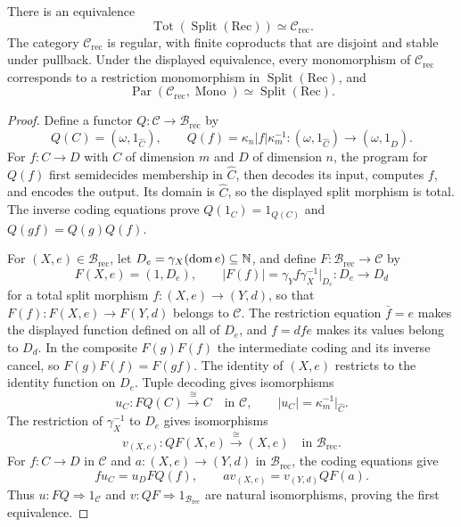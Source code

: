 \begin{proposition}\label{prop:numerical-structure}
There is an equivalence
\[
 \operatorname{Tot}(\operatorname{Split}(\mathrm{Rec}))
       \simeq\mathcal C_{\mathrm{rec}}.
\]
The category $\mathcal C_{\mathrm{rec}}$ is regular, with finite
coproducts that are disjoint and stable under pullback. Under the
displayed equivalence, every monomorphism of $\mathcal C_{\mathrm{rec}}$
corresponds to a restriction monomorphism in
$\operatorname{Split}(\mathrm{Rec})$, and
\[
 \operatorname{Par}(\mathcal C_{\mathrm{rec}},\operatorname{Mono})
       \simeq\operatorname{Split}(\mathrm{Rec}).
\]
\end{proposition}
\begin{proof}
Define a functor $Q:\mathcal C\to\mathcal B_{\mathrm{rec}}$ by
\[
 Q(C)=(\omega,1_{\widehat C}),\qquad
 Q(f)=\kappa_n |f|\kappa_m^{-1}:
     (\omega,1_{\widehat C})\longrightarrow
     (\omega,1_{\widehat D}).
\]
For $f:C\to D$ with $C$ of dimension $m$ and $D$ of dimension $n$,
the program for $Q(f)$ first semidecides membership
in $\widehat C$, then decodes its input, computes $f$, and encodes
the output. Its domain is $\widehat C$, so the displayed
split morphism is total. The inverse coding equations prove
$Q(1_C)=1_{Q(C)}$ and $Q(gf)=Q(g)Q(f)$.

For $(X,e)\in\mathcal B_{\mathrm{rec}}$, let
$D_e=\gamma_X(\operatorname{dom}e)\subseteq\mathbb N$, and define
$F:\mathcal B_{\mathrm{rec}}\to\mathcal C$ by
\[
 F(X,e)=(1,D_e),\qquad
 |F(f)|=\gamma_Y f\gamma_X^{-1}|_{D_e}:D_e\longrightarrow D_d
\]
for a total split morphism $f:(X,e)\to(Y,d)$, so that
$F(f):F(X,e)\to F(Y,d)$ belongs to $\mathcal C$.
The restriction equation $\bar f=e$ makes the displayed function defined
on all of $D_e$, and $f=dfe$ makes its values belong to $D_d$. In the composite $F(g)F(f)$ the intermediate coding and its inverse
cancel, so $F(g)F(f)=F(gf)$. The identity of $(X,e)$ restricts to
the identity function on $D_e$.
Tuple decoding gives isomorphisms
\[
 u_C:FQ(C)\xrightarrow{\cong}C
       \quad\text{in }\mathcal C,\qquad
       |u_C|=\kappa_m^{-1}|_{\widehat C}.
\]
The restriction of $\gamma_X^{-1}$ to $D_e$ gives isomorphisms
\[
 v_{(X,e)}:QF(X,e)\xrightarrow{\cong}(X,e)
       \quad\text{in }\mathcal B_{\mathrm{rec}}.
\]
For $f:C\to D$ in $\mathcal C$ and
$a:(X,e)\to(Y,d)$ in $\mathcal B_{\mathrm{rec}}$,
the coding equations give
\[
 f u_C=u_DFQ(f),\qquad
 a v_{(X,e)}=v_{(Y,d)}QF(a).
\]
Thus $u:FQ\Rightarrow1_{\mathcal C}$ and
$v:QF\Rightarrow1_{\mathcal B_{\mathrm{rec}}}$ are natural
isomorphisms, proving the first equivalence.


\end{proof}
